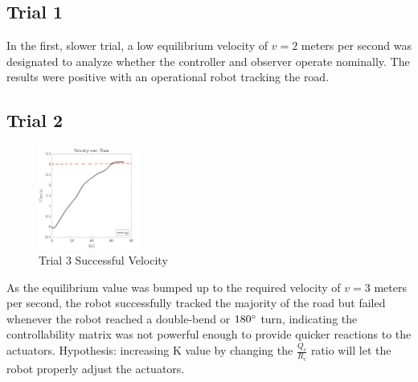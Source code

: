\documentclass[12pt]{article}
\begin{document}
\subsection{Trial 1} \label{sec:4.1}
In the first, slower trial, a low equilibrium velocity of $v = 2$ meters per second was designated to analyze whether the controller and observer operate nominally.  The results were positive with an operational robot tracking the road.

\subsection{Trial 2} \label{sec:4.2}
\begin{figure}
\vspace{-6em}%
\includegraphics[width=0.3\textwidth]{File_001.png}
\vspace{-2em}
\caption{\tiny{Trial 3 Successful Velocity} \label{figure:2}}
\end{figure}
As the equilibrium value was bumped up to the required velocity of $v = 3$ meters per second, the robot successfully tracked the majority of the road but failed whenever the robot reached a double-bend or $180\degree$ turn, indicating the controllability matrix was not powerful enough to provide quicker reactions to the actuators.  Hypothesis: increasing K value by changing the $\frac{Q_c}{R_c}$ ratio will let the robot properly adjust the actuators.
\end{document}
